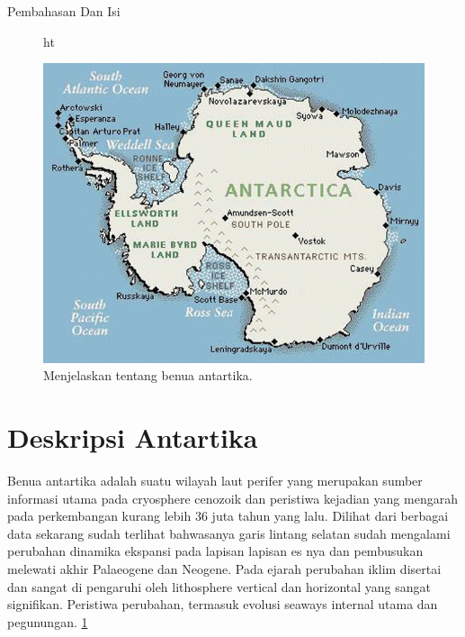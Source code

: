 

																		
Pembahasan Dan Isi 

\begin{figure}{ht}
\centerline{\includegraphics[width=1\textwidth]{figures/antartic.PNG}}
\caption{Menjelaskan tentang benua antartika.}
\label{Antartika}
\end{figure}

\section{Deskripsi Antartika}



		Benua antartika adalah suatu wilayah laut perifer yang merupakan sumber informasi utama pada cryosphere cenozoik dan peristiwa 
	kejadian yang mengarah pada perkembangan kurang lebih 36 juta tahun yang lalu. Dilihat dari berbagai data sekarang sudah terlihat bahwasanya 
	garis lintang selatan sudah mengalami perubahan dinamika ekspansi pada lapisan lapisan es nya dan pembusukan melewati akhir Palaeogene dan Neogene. 
	Pada ejarah perubahan iklim disertai dan sangat di pengaruhi oleh lithosphere vertical dan horizontal yang sangat signifikan. Peristiwa perubahan, 
	termasuk evolusi seaways internal utama dan pegunungan. \ref{Antartika}
		
